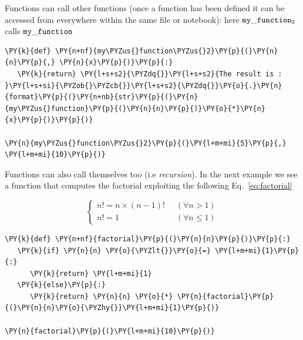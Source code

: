 \begin{Shaded}
\begin{Highlighting}[]
\end{Highlighting}
\end{Shaded}

Functions can call other functions (once a function has been defined it can be accessed 
from everywhere within the same file or notebook): here $\tt{my\_function_2}$ calls $\tt{my\_function}$

\begin{codebox}[breakable, size=fbox, boxrule=1pt, pad at break*=1mm,colback=cellbackground, colframe=cellborder]
\begin{Verbatim}[commandchars=\\\{\}]
\PY{k}{def} \PY{n+nf}{my\PYZus{}function\PYZus{}2}\PY{p}{(}\PY{n}{n}\PY{p}{,} \PY{n}{x}\PY{p}{)}\PY{p}{:} 
   \PY{k}{return} \PY{l+s+s2}{\PYZdq{}}\PY{l+s+s2}{The result is : }\PY{l+s+si}{\PYZob{}\PYZcb{}}\PY{l+s+s2}{\PYZdq{}}\PY{o}{.}\PY{n}{format}\PY{p}{(}\PY{n+nb}{str}\PY{p}{(}\PY{n}{my\PYZus{}function}\PY{p}{(}\PY{n}{n}\PY{p}{)}\PY{o}{*}\PY{n}{x}\PY{p}{)}\PY{p}{)}

\PY{n}{my\PYZus{}function\PYZus{}2}\PY{p}{(}\PY{l+m+mi}{5}\PY{p}{,} \PY{l+m+mi}{10}\PY{p}{)}
\end{Verbatim}
\end{codebox}

Functions can also call themselves too (i.e \emph{recursion}). In the next example we see a function 
that computes the factorial exploiting the following Eq.~\ref{eq:factorial}

\begin{equation}
\begin{cases}
    n! = n \times (n-1)! & \;\; (\forall n \gt 1) \\
    n! = 1 & \;\; (\forall n \le 1)
\end{cases}
\label{eq:factorial}
\end{equation}

\begin{codebox}[breakable, size=fbox, boxrule=1pt, pad at break*=1mm,colback=cellbackground, colframe=cellborder]
\begin{Verbatim}[commandchars=\\\{\}]
\PY{k}{def} \PY{n+nf}{factorial}\PY{p}{(}\PY{n}{n}\PY{p}{)}\PY{p}{:}
   \PY{k}{if} \PY{n}{n} \PY{o}{\PYZlt{}}\PY{o}{=} \PY{l+m+mi}{1}\PY{p}{:}
      \PY{k}{return} \PY{l+m+mi}{1}
   \PY{k}{else}\PY{p}{:}
      \PY{k}{return} \PY{n}{n} \PY{o}{*} \PY{n}{factorial}\PY{p}{(}\PY{n}{n}\PY{o}{\PYZhy{}}\PY{l+m+mi}{1}\PY{p}{)}

\PY{n}{factorial}\PY{p}{(}\PY{l+m+mi}{10}\PY{p}{)}
\end{Verbatim}
\end{codebox}

